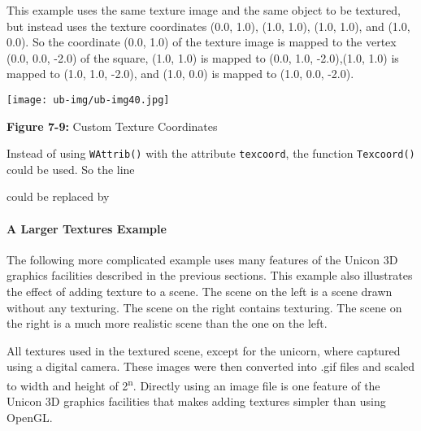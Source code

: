 
This example uses the same texture image and the same object to be
textured, but instead uses the texture coordinates (0.0, 1.0), (1.0,
1.0), (1.0, 1.0), and (1.0, 0.0). So the coordinate (0.0, 1.0) of the
texture image is mapped to the vertex (0.0, 0.0, -2.0) of the square,
(1.0, 1.0) is mapped to (0.0, 1.0, -2.0),(1.0, 1.0) is mapped to (1.0,
1.0, -2.0), and (1.0, 0.0) is mapped to (1.0, 0.0, -2.0).

\begin{center}
{
\texttt{[image: ub-img/ub-img40.jpg]}}

{\sffamily\bfseries Figure 7-9:}
{\sffamily Custom Texture Coordinates}
\end{center}


Instead of using \texttt{WAttrib()} with the attribute \texttt{texcoord},
the function \texttt{Texcoord()} could be used. So the line


\noindent
could be replaced by


\paragraph[A Larger Textures Example]{A Larger Textures Example}
The following more complicated example uses many features of the
Unicon 3D graphics facilities described in the previous sections.
This example also illustrates the effect of adding texture to a scene.
The scene on the left is a scene drawn without any texturing.  The
scene on the right contains texturing. The scene on the right is a
much more realistic scene than the one on the left.

All textures used in the textured scene, except for the unicorn, where
captured using a digital camera. These images were then converted into
.gif files and scaled to width and height of 2\textsuperscript{n}.
Directly using an image file is one feature of the Unicon 3D graphics
facilities that makes adding textures simpler than using OpenGL.

